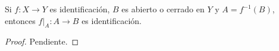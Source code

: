 

\begin{theorem}
Si $f : X \longrightarrow Y$ es identificación, $B$ es abierto o cerrado en $Y$ y $A = f^{-1}(B)$, entonces $f|_{A} : A \longrightarrow B$ es identificación.
\end{theorem}

\begin{proof}
Pendiente.
\end{proof}
